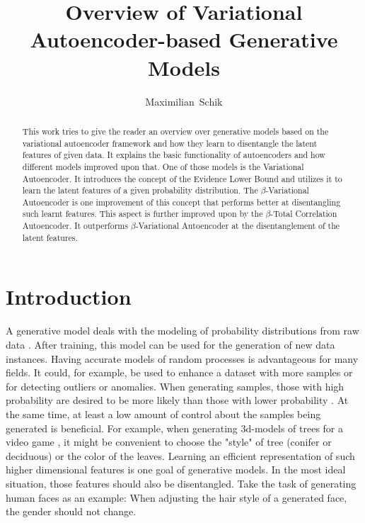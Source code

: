 \documentclass[a4paper]{IEEEtran}
\title{Overview of Variational Autoencoder-based Generative Models}
\author{Maximilian~Schik}
\begin{document}
\maketitle

\begin{abstract}
This work tries to give the reader an overview over generative models based on the variational autoencoder framework and how they learn to disentangle the latent features of given data. It explains the basic functionality of autoencoders and how different models improved upon that. One of those models is the Variational Autoencoder. It introduces the concept of the Evidence Lower Bound and utilizes it to learn the latent features of a given probability distribution. The $\beta$-Variational Autoencoder is one improvement of this concept that performs better at disentangling such learnt features. This aspect is further improved upon by the $\beta$-Total Correlation Autoencoder. It outperforms $\beta$-Variational Autoencoder at the disentanglement of the latent features.
\end{abstract}

\section{Introduction}
A generative model deals with the modeling of probability distributions from raw data \cite{doersch2016tutorial}. After training, this model can be used for the generation of new data instances. Having accurate models of random processes is advantageous for many fields. It could, for example, be used to enhance a dataset with more samples or for detecting outliers or anomalies. When generating samples, those with high probability are desired to be more likely than those with lower probability \cite{doersch2016tutorial}. At the same time, at least a low amount of control about the samples being generated is beneficial. For example, when generating 3d-models of trees for a video game \cite{doersch2016tutorial}, it might be convenient to choose the "style" of tree (conifer or deciduous) or the color of the leaves. Learning an efficient representation of such higher dimensional features is one goal of generative models. In the most ideal situation, those features should also be disentangled. Take the task of generating human faces as an example: When adjusting the hair style of a generated face, the gender should not change.
\end{document}
